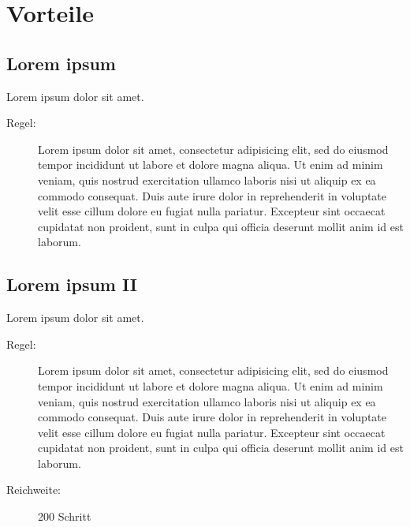 \documentclass[DIV=15]{scrartcl}
\let\stdsection\section
\renewcommand\section{\newpage\stdsection}
\begin{document}
\section*{Vorteile}
  \begin{multicols}{2}
    \subsection*{Lorem ipsum}
    Lorem ipsum dolor sit amet.
    \begin{description}
      \item[Regel:] Lorem ipsum dolor sit amet, consectetur adipisicing elit, sed do eiusmod tempor incididunt ut labore et dolore magna aliqua. Ut enim ad minim veniam, quis nostrud exercitation ullamco laboris nisi ut aliquip ex ea commodo consequat. Duis aute irure dolor in reprehenderit in voluptate velit esse cillum dolore eu fugiat nulla pariatur. Excepteur sint occaecat cupidatat non proident, sunt in culpa qui officia deserunt mollit anim id est laborum.
    \end{description}


    \subsection*{Lorem ipsum II}
    Lorem ipsum dolor sit amet.
    \begin{description}
      \item[Regel:] Lorem ipsum dolor sit amet, consectetur adipisicing elit, sed do eiusmod tempor incididunt ut labore et dolore magna aliqua. Ut enim ad minim veniam, quis nostrud exercitation ullamco laboris nisi ut aliquip ex ea commodo consequat. Duis aute irure dolor in reprehenderit in voluptate velit esse cillum dolore eu fugiat nulla pariatur. Excepteur sint occaecat cupidatat non proident, sunt in culpa qui officia deserunt mollit anim id est laborum.
      \item[Reichweite:] 200 Schritt
    \end{description}

  \end{multicols}
\end{document}
